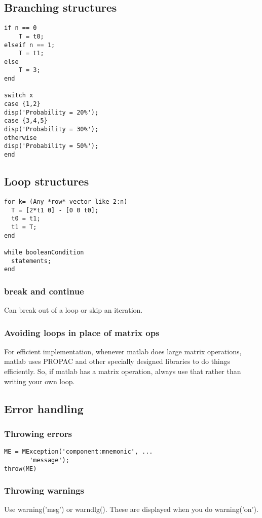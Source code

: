 \documentclass[oneside, article]{memoir}
\begin{document}
\subsection{Branching structures}
\begin{verbatim}
if n == 0
    T = t0;
elseif n == 1;
    T = t1;
else
    T = 3;
end

switch x
case {1,2}
disp('Probability = 20%');
case {3,4,5}
disp('Probability = 30%');
otherwise
disp('Probability = 50%');
end
\end{verbatim}

\subsection{Loop structures}
\begin{verbatim}
for k= (Any *row* vector like 2:n)
  T = [2*t1 0] - [0 0 t0];
  t0 = t1;
  t1 = T;
end

while booleanCondition
  statements;
end
\end{verbatim}

\subsubsection{break and continue}
Can break out of a loop or skip an iteration.

\subsubsection{Avoiding loops in place of matrix ops}
For efficient implementation, whenever matlab does large matrix operations, matlab uses PROPAC and other specially designed libraries to do things efficiently. So, if matlab has a matrix operation, always use that rather than writing your own loop.

\subsection{Error handling}
\subsubsection{Throwing errors}
\begin{verbatim}
ME = MException('component:mnemonic', ...
       'message');
throw(ME)
\end{verbatim}


\subsubsection{Throwing warnings}
Use warning('msg') or warndlg(). These are displayed when you do warning('on').
\end{document}
